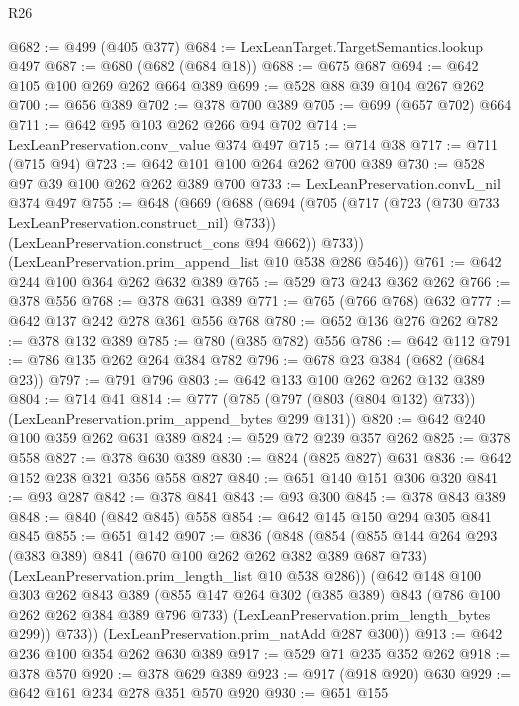 \begin{lexlean}{R26}
\begin{coremodule}
@682 := @499 (@405 @377)
@684 := LexLeanTarget.TargetSemantics.lookup @497
@687 := @680 (@682 (@684 @18))
@688 := @675 @687
@694 := @642 @105 @100 @269 @262 @664 @389
@699 := @528 @88 @39 @104 @267 @262
@700 := @656 @389
@702 := @378 @700 @389
@705 := @699 (@657 @702) @664
@711 := @642 @95 @103 @262 @266 @94 @702
@714 := LexLeanPreservation.conv_value @374 @497
@715 := @714 @38
@717 := @711 (@715 @94)
@723 := @642 @101 @100 @264 @262 @700 @389
@730 := @528 @97 @39 @100 @262 @262 @389 @700
@733 := LexLeanPreservation.convL_nil @374 @497
@755 := @648
    (@669
      (@688
        (@694
          (@705
            (@717 (@723 (@730 @733 LexLeanPreservation.construct_nil) @733))
            (LexLeanPreservation.construct_cons @94 @662))
          @733))
      (LexLeanPreservation.prim_append_list @10 @538 @286 @546))
@761 := @642 @244 @100 @364 @262 @632 @389
@765 := @529 @73 @243 @362 @262
@766 := @378 @556
@768 := @378 @631 @389
@771 := @765 (@766 @768) @632
@777 := @642 @137 @242 @278 @361 @556 @768
@780 := @652 @136 @276 @262
@782 := @378 @132 @389
@785 := @780 (@385 @782) @556
@786 := @642 @112
@791 := @786 @135 @262 @264 @384 @782
@796 := @678 @23 @384 (@682 (@684 @23))
@797 := @791 @796
@803 := @642 @133 @100 @262 @262 @132 @389
@804 := @714 @41
@814 := @777 (@785 (@797 (@803 (@804 @132) @733)) (LexLeanPreservation.prim_append_bytes @299 @131))
@820 := @642 @240 @100 @359 @262 @631 @389
@824 := @529 @72 @239 @357 @262
@825 := @378 @558
@827 := @378 @630 @389
@830 := @824 (@825 @827) @631
@836 := @642 @152 @238 @321 @356 @558 @827
@840 := @651 @140 @151 @306 @320
@841 := @93 @287
@842 := @378 @841
@843 := @93 @300
@845 := @378 @843 @389
@848 := @840 (@842 @845) @558
@854 := @642 @145 @150 @294 @305 @841 @845
@855 := @651 @142
@907 := @836
    (@848
      (@854
        (@855
          @144
          @264
          @293
          (@383 @389)
          @841
          (@670 @100 @262 @262 @382 @389 @687 @733)
          (LexLeanPreservation.prim_length_list @10 @538 @286))
        (@642
          @148
          @100
          @303
          @262
          @843
          @389
          (@855
            @147
            @264
            @302
            (@385 @389)
            @843
            (@786 @100 @262 @262 @384 @389 @796 @733)
            (LexLeanPreservation.prim_length_bytes @299))
          @733))
      (LexLeanPreservation.prim_natAdd @287 @300))
@913 := @642 @236 @100 @354 @262 @630 @389
@917 := @529 @71 @235 @352 @262
@918 := @378 @570
@920 := @378 @629 @389
@923 := @917 (@918 @920) @630
@929 := @642 @161 @234 @278 @351 @570 @920
@930 := @651 @155

\end{coremodule}
\end{lexlean}

